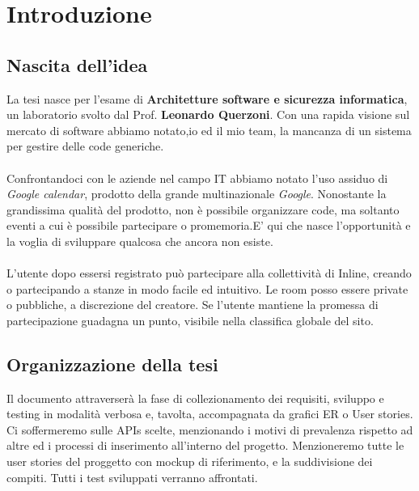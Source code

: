 \chapter{Introduzione}
	\section{Nascita dell'idea}
	La tesi nasce per l'esame di \textbf{Architetture software e sicurezza informatica}, un laboratorio svolto dal Prof. \textbf{Leonardo Querzoni}. Con una rapida visione sul mercato di software abbiamo notato,io ed il mio team, la mancanza di un sistema per gestire delle code generiche.\\\\
	Confrontandoci con le aziende nel campo IT abbiamo notato l'uso assiduo di \textsl{Google calendar}, prodotto della grande multinazionale \textsl{Google}. Nonostante la grandissima qualità del prodotto, non è possibile organizzare code, ma soltanto eventi a cui è possibile partecipare o promemoria.E' qui che nasce l'opportunità e la voglia di sviluppare qualcosa che ancora non esiste.\\\\
	L'utente dopo essersi registrato può partecipare alla collettività di Inline, creando o partecipando a stanze in  modo facile ed intuitivo. Le room posso essere private o pubbliche, a discrezione del creatore. Se l'utente mantiene la promessa di partecipazione guadagna un punto, visibile nella classifica globale del sito.
	
	
	\section{Organizzazione della tesi}
	Il documento attraverserà la fase di collezionamento dei requisiti, sviluppo e testing in modalità verbosa e, tavolta, accompagnata da grafici ER o User stories.\\
	Ci soffermeremo sulle APIs scelte, menzionando i motivi di prevalenza rispetto ad altre ed i processi di inserimento all'interno del progetto.
	Menzioneremo tutte le user stories del proggetto con mockup di riferimento, e la suddivisione dei compiti. Tutti i test sviluppati verranno affrontati.